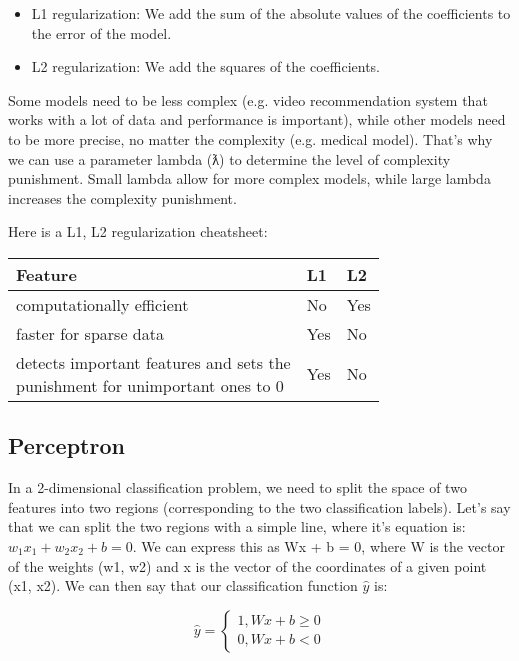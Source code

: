 \documentclass{article}
\begin{document}
\begin{itemize}
  \item L1 regularization: We add the sum of the absolute values of the coefficients to the error of the model.
  \item L2 regularization: We add the squares of the coefficients.
\end{itemize}

Some models need to be less complex (e.g. video recommendation system that works with a lot of data and performance is important), while other models need to be more precise, no matter the complexity (e.g. medical model). That’s why we can use a parameter lambda (ƛ) to determine the level of complexity punishment. Small lambda allow for more complex models, while large lambda increases the complexity punishment.

Here is a L1, L2 regularization cheatsheet:

\begin{center}
\begin{tabular}{ |l|l|l| }
  \hline
   Feature & L1 & L2 \\
  \hline
  computationally efficient & No & Yes \\
  faster for sparse data & Yes & No \\
  \makecell{detects important features and sets the \\ punishment for unimportant ones to 0} & Yes & No \\
  \hline
\end{tabular}
\end{center}

\subsection{Perceptron}
In a 2-dimensional classification problem, we need to split the space of two features into two regions (corresponding to the two classification labels). Let’s say that we can split the two regions with a simple line, where it’s equation is: $w_1 x_1 + w_2 x_2 + b = 0$. We can express this as Wx + b = 0, where W is the vector of the weights (w1, w2) and x is the vector of the coordinates of a given point (x1, x2). We can then say that our classification function $\hat{y}$ is:

\begin{equation}
  \hat{y} = \left\{
              \begin{array}{ll}
                1 , Wx + b \geq 0\\
                0 , Wx + b < 0
                \end{array}
              \right.
\end{equation}
\end{document}
